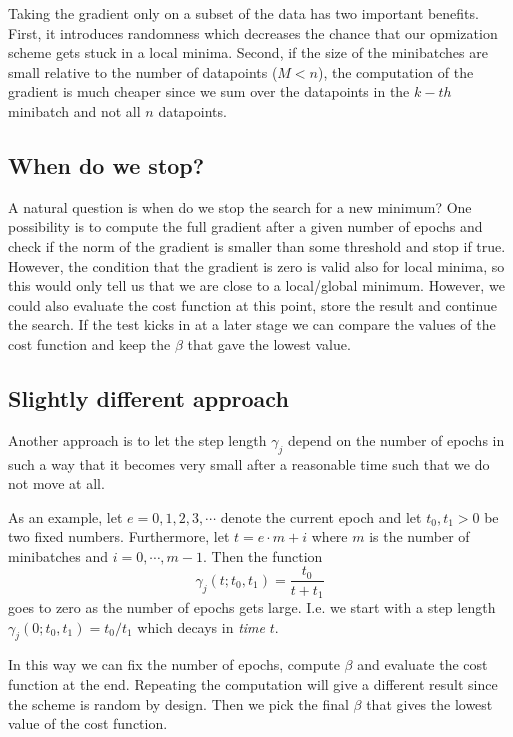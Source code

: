 \documentclass[%
oneside,                 %
final,                   %
10pt]{article}
\begin{document}
Taking the gradient only on a subset of the data has two important
benefits. First, it introduces randomness which decreases the chance
that our opmization scheme gets stuck in a local minima. Second, if
the size of the minibatches are small relative to the number of
datapoints ($M <  n$), the computation of the gradient is much
cheaper since we sum over the datapoints in the $k-th$ minibatch and not
all $n$ datapoints.

\subsection*{When do we stop?}

A natural question is when do we stop the search for a new minimum?
One possibility is to compute the full gradient after a given number
of epochs and check if the norm of the gradient is smaller than some
threshold and stop if true. However, the condition that the gradient
is zero is valid also for local minima, so this would only tell us
that we are close to a local/global minimum. However, we could also
evaluate the cost function at this point, store the result and
continue the search. If the test kicks in at a later stage we can
compare the values of the cost function and keep the $\beta$ that
gave the lowest value.

\subsection*{Slightly different approach}

Another approach is to let the step length $\gamma_j$ depend on the
number of epochs in such a way that it becomes very small after a
reasonable time such that we do not move at all.

As an example, let $e = 0,1,2,3,\cdots$ denote the current epoch and let $t_0, t_1 > 0$ be two fixed numbers. Furthermore, let $t = e \cdot m + i$ where $m$ is the number of minibatches and $i=0,\cdots,m-1$. Then the function $$\gamma_j(t; t_0, t_1) = \frac{t_0}{t+t_1} $$ goes to zero as the number of epochs gets large. I.e. we start with a step length $\gamma_j (0; t_0, t_1) = t_0/t_1$ which decays in \emph{time} $t$.

In this way we can fix the number of epochs, compute $\beta$ and
evaluate the cost function at the end. Repeating the computation will
give a different result since the scheme is random by design. Then we
pick the final $\beta$ that gives the lowest value of the cost
function.
\end{document}
